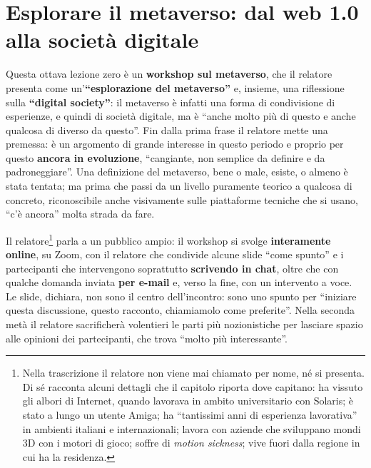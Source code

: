 \chapter[Esplorare il metaverso]{Esplorare il metaverso: dal web 1.0 alla
società digitale}
\label{z8:cap:metaverso}

Questa ottava lezione zero è un \textbf{workshop sul metaverso}, che il relatore
presenta come un'\textbf{``esplorazione del metaverso''} e, insieme, una
riflessione sulla \textbf{``digital society''}: il metaverso è infatti una forma
di condivisione di esperienze, e quindi di società digitale, ma è ``anche molto
più di questo e anche qualcosa di diverso da questo''. Fin dalla prima frase il
relatore mette una premessa: è un argomento di grande interesse in questo
periodo e proprio per questo \textbf{ancora in evoluzione}, ``cangiante, non
semplice da definire e da padroneggiare''. Una definizione del metaverso, bene o
male, esiste, o almeno è stata tentata; ma prima che passi da un livello
puramente teorico a qualcosa di concreto, riconoscibile anche visivamente sulle
piattaforme tecniche che si usano, ``c'è ancora'' molta strada da fare.

Il relatore\footnote{Nella trascrizione il relatore non viene mai chiamato per
nome, né si presenta. Di sé racconta alcuni dettagli che il capitolo riporta
dove capitano: ha vissuto gli albori di Internet, quando lavorava in ambito
universitario con Solaris; è stato a lungo un utente Amiga; ha ``tantissimi anni
di esperienza lavorativa'' in ambienti italiani e internazionali; lavora con
aziende che sviluppano mondi 3D con i motori di gioco; soffre di
\emph{motion sickness}; vive fuori dalla regione in cui ha la residenza.} parla
a un pubblico ampio: il workshop si svolge \textbf{interamente online}, su Zoom,
con il relatore che condivide alcune slide ``come spunto'' e i partecipanti che
intervengono soprattutto \textbf{scrivendo in chat}, oltre che con qualche
domanda inviata \textbf{per e-mail} e, verso la fine, con un intervento a voce.
Le slide, dichiara, non sono il centro dell'incontro: sono uno spunto per
``iniziare questa discussione, questo racconto, chiamiamolo come preferite''.
Nella seconda metà il relatore sacrificherà volentieri le parti più
nozionistiche per lasciare spazio alle opinioni dei partecipanti, che trova
``molto più interessante''.


